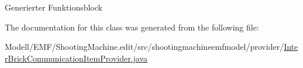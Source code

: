 Generierter Funktionsblock 

The documentation for this class was generated from the following file\-:\begin{DoxyCompactItemize}
\item 
Modell/\-E\-M\-F/\-Shooting\-Machine.\-edit/src/shootingmachineemfmodel/provider/\hyperlink{_inter_brick_communication_item_provider_8java}{Inter\-Brick\-Communication\-Item\-Provider.\-java}\end{DoxyCompactItemize}
